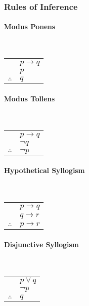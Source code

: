 \documentclass[a4paper, 10pt]{article}
\begin{document}
\subsubsection{Rules of Inference}
\begin{multicols}{3}
\paragraph{Modus Ponens}\mbox{}\\
\begin{tabular}{c@{\,}l@{}}
                & \(p\rightarrow q\) \\
                & \(p\) \\\cline{2-2}
\(\therefore\)  & \(q\)
\end{tabular}

\paragraph{Modus Tollens}\mbox{}\\
\begin{tabular}{c@{\,}l@{}}
                & \(p\rightarrow q\) \\
                & \(\neg q\) \\\cline{2-2}
\(\therefore\)  & \(\neg p\)
\end{tabular}

\paragraph{Hypothetical Syllogism}\mbox{}\\
\begin{tabular}{c@{\,}l@{}}
                & \(p\rightarrow q\) \\
                & \(q\rightarrow r\) \\\cline{2-2}
\(\therefore\)  & \(p\rightarrow r\)
\end{tabular}

\paragraph{Disjunctive Syllogism}\mbox{}\\
\begin{tabular}{c@{\,}l@{}}
                & \(p\lor q\) \\
                & \(\neg p\) \\\cline{2-2}
\(\therefore\)  & \(q\)
\end{tabular}


\end{multicols}
\end{document}
